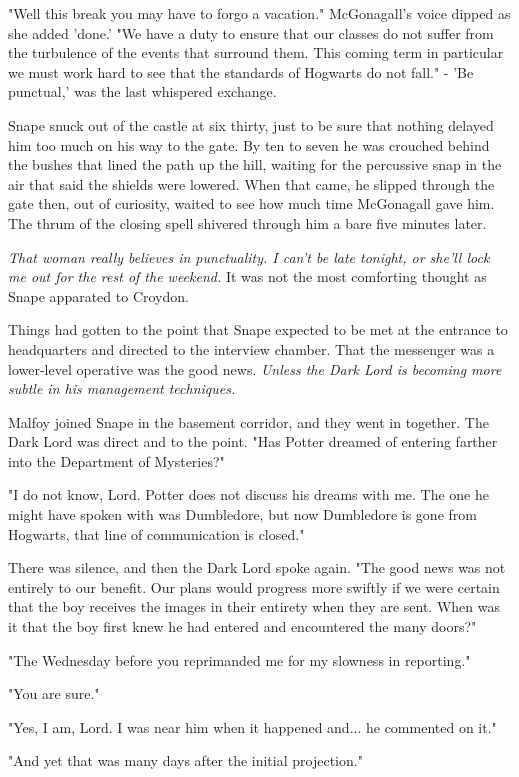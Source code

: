 \documentclass[a4paper,11pt]{article}
\begin{document}
"Well this break you may have to forgo a vacation." McGonagall's voice dipped as she added 'done.' "We have a duty to ensure that our classes do not suffer from the turbulence of the events that surround them. This coming term in particular we must work hard to see that the standards of Hogwarts do not fall." - 'Be punctual,' was the last whispered exchange.

Snape snuck out of the castle at six thirty, just to be sure that nothing delayed him too much on his way to the gate. By ten to seven he was crouched behind the bushes that lined the path up the hill, waiting for the percussive snap in the air that said the shields were lowered. When that came, he slipped through the gate then, out of curiosity, waited to see how much time McGonagall gave him. The thrum of the closing spell shivered through him a bare five minutes later.

\emph{That woman really believes in punctuality. I can't be late tonight, or she'll lock me out for the rest of the weekend.} It was not the most comforting thought as Snape apparated to Croydon.

Things had gotten to the point that Snape expected to be met at the entrance to headquarters and directed to the interview chamber. That the messenger was a lower-level operative was the good news. \emph{Unless the Dark Lord is becoming more subtle in his management techniques.}

Malfoy joined Snape in the basement corridor, and they went in together. The Dark Lord was direct and to the point. "Has Potter dreamed of entering farther into the Department of Mysteries?"

"I do not know, Lord. Potter does not discuss his dreams with me. The one he might have spoken with was Dumbledore, but now Dumbledore is gone from Hogwarts, that line of communication is closed."

There was silence, and then the Dark Lord spoke again. "The good news was not entirely to our benefit. Our plans would progress more swiftly if we were certain that the boy receives the images in their entirety when they are sent. When was it that the boy first knew he had entered and encountered the many doors?"

"The Wednesday before you reprimanded me for my slowness in reporting."

"You are sure."

"Yes, I am, Lord. I was near him when it happened and... he commented on it."

"And yet that was many days after the initial projection."
\end{document}
